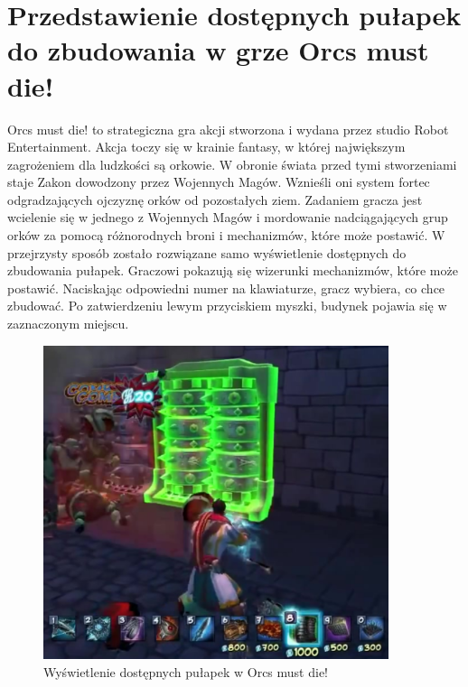 \section{Przedstawienie dostępnych pułapek do zbudowania w grze Orcs must die!}\label{chap:omd}

Orcs must die! to strategiczna gra akcji stworzona i wydana przez studio Robot Entertainment. Akcja toczy się w krainie fantasy, w której największym zagrożeniem dla ludzkości są orkowie. W obronie świata przed tymi stworzeniami staje Zakon dowodzony przez Wojennych Magów. Wznieśli oni system fortec odgradzających ojczyznę orków od pozostałych ziem. Zadaniem gracza jest wcielenie się w jednego z  Wojennych Magów i mordowanie nadciągających grup orków za pomocą różnorodnych broni i mechanizmów, które może postawić.
W przejrzysty sposób zostało rozwiązane samo wyświetlenie dostępnych do zbudowania pułapek. Graczowi pokazują się wizerunki mechanizmów, które może postawić. Naciskając odpowiedni numer na klawiaturze, gracz wybiera, co chce zbudować. Po zatwierdzeniu lewym przyciskiem myszki, budynek pojawia się w zaznaczonym miejscu.

\begin{figure}[h!tbp]
    \centering
    \includegraphics[width=0.9\textwidth]{images/ui/buoildingsOrcs.png}
    \caption{Wyświetlenie dostępnych pułapek w Orcs must die!}\label{fig:Orcs}
\end{figure}
